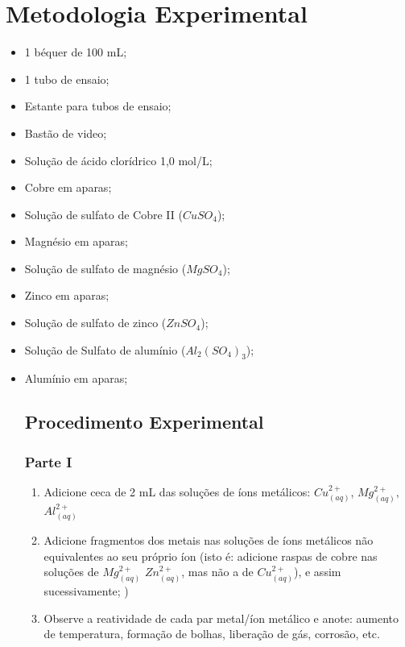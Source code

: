 \chapter{Metodologia Experimental}
\begin{itemize}
 \section{Materiais e Reagentes}

  \item 1 béquer de 100 mL;
  \item 1 tubo de ensaio;
  \item Estante para tubos de ensaio;
  \item Bastão de video;
  \item Solução de ácido clorídrico 1,0 mol/L;
  \item Cobre em aparas;
  \item Solução de sulfato de Cobre II ($CuSO_4$);
  \item Magnésio em aparas;
  \item Solução de sulfato de magnésio ($MgSO_4$);
  \item Zinco em aparas;
  \item Solução de sulfato de zinco ($ZnSO_4$);
  \item Solução de Sulfato de alumínio ($Al_2(SO_4)_3$);
  \item Alumínio em aparas;

 \section{Procedimento Experimental}
 \subsection{Parte I}
 \begin{enumerate}
  \item Adicione ceca de 2 mL das soluções de íons metálicos: $Cu^{2+}_{(aq)}$, $Mg^{2+}_{(aq)},$ $Al^{2+}_{(aq)}$
  \item Adicione fragmentos dos metais nas soluções de íons metálicos não equivalentes ao seu próprio íon (isto é: adicione raspas de cobre nas soluções de $Mg^{2+}_{(aq)}$ $Zn^{2+}_{(aq)}$, mas não a de $Cu^{2+}_{(aq)}$), e assim sucessivamente; )

  \item Observe a reatividade de cada par metal/íon metálico e anote: aumento de temperatura, formação de bolhas, liberação de gás, corrosão, etc. 


\end{enumerate}
\end{itemize}
